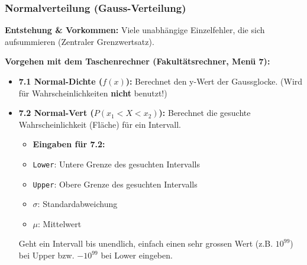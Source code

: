     \subsubsection{Normalverteilung (Gauss-Verteilung)}
        \textbf{Entstehung \& Vorkommen:} Viele unabhängige Einzelfehler, die sich aufsummieren (Zentraler Grenzwertsatz).
        \begin{center}
        \end{center}

        \textbf{Vorgehen mit dem Taschenrechner (Fakultätsrechner, Menü 7):}
        \begin{itemize}
            \item \textbf{7.1 Normal-Dichte ($f(x)$):} Berechnet den y-Wert der Gaussglocke. (Wird für Wahrscheinlichkeiten \textbf{nicht} benutzt!)
            \item \textbf{7.2 Normal-Vert ($P(x_1 < X < x_2)$):} Berechnet die gesuchte Wahrscheinlichkeit (Fläche) für ein Intervall. 
            \begin{itemize}
                \item \textbf{Eingaben für 7.2:}
                \item \texttt{Lower}: Untere Grenze des gesuchten Intervalls
                \item \texttt{Upper}: Obere Grenze des gesuchten Intervalls
                \item \texttt{$\sigma$}: Standardabweichung
                \item \texttt{$\mu$}: Mittelwert
            \end{itemize}
            Geht ein Intervall bis unendlich, einfach einen sehr grossen Wert (z.B. $10^{99}$) bei Upper bzw. $-10^{99}$ bei Lower eingeben.
        \end{itemize}

